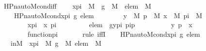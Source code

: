 \begin{isabellebody}
\isamarkupfalse%
\ HPn{\isacharunderscore}{\kern0pt}auto{\isacharunderscore}{\kern0pt}M{\isacharunderscore}{\kern0pt}cond{\isacharunderscore}{\kern0pt}iff\ {\isacharcolon}{\kern0pt}\ \isanewline
\ \ {\isachardoublequoteopen}x{\isacharunderscore}{\kern0pt}pi\ {\isasymin}\ M\ {\isasymLongrightarrow}\ g\ {\isasymin}\ M\ {\isasymLongrightarrow}\ elem\ {\isasymin}\ M\ {\isasymLongrightarrow}\ \isanewline
\ \ \ \ HPn{\isacharunderscore}{\kern0pt}auto{\isacharunderscore}{\kern0pt}M{\isacharunderscore}{\kern0pt}cond{\isacharparenleft}{\kern0pt}x{\isacharunderscore}{\kern0pt}pi{\isacharcomma}{\kern0pt}\ g{\isacharcomma}{\kern0pt}\ elem{\isacharparenright}{\kern0pt}\ {\isasymlongleftrightarrow}\ \isanewline
\ \ \ \ \ \ {\isacharparenleft}{\kern0pt}{\isasymexists}y\ {\isasymin}\ M{\isachardot}{\kern0pt}\ {\isasymexists}p\ {\isasymin}\ M{\isachardot}{\kern0pt}\ {\isasymexists}x\ {\isasymin}\ M{\isachardot}{\kern0pt}\ {\isasymexists}pi\ {\isasymin}\ M{\isachardot}{\kern0pt}\ \isanewline
\ \ \ \ \ \ \ \ x{\isacharunderscore}{\kern0pt}pi\ {\isacharequal}{\kern0pt}\ {\isacharless}{\kern0pt}x{\isacharcomma}{\kern0pt}\ pi{\isachargreater}{\kern0pt}\ {\isasymand}\isanewline
\ \ \ \ \ \ \ \ elem\ {\isacharequal}{\kern0pt}\ {\isacharless}{\kern0pt}g{\isacharbackquote}{\kern0pt}{\isacharless}{\kern0pt}y{\isacharcomma}{\kern0pt}pi{\isachargreater}{\kern0pt}{\isacharcomma}{\kern0pt}\ pi{\isacharbackquote}{\kern0pt}p{\isachargreater}{\kern0pt}\ {\isasymand}\ \isanewline
\ \ \ \ \ \ \ \ {\isacharless}{\kern0pt}y{\isacharcomma}{\kern0pt}\ p{\isachargreater}{\kern0pt}\ {\isasymin}\ x\ {\isasymand}\ \isanewline
\ \ \ \ \ \ \ \ function{\isacharparenleft}{\kern0pt}pi{\isacharparenright}{\kern0pt}\isanewline
\ \ \ \ \ {\isacharparenright}{\kern0pt}{\isachardoublequoteclose}\isanewline
%
\isadelimproof
%
\endisadelimproof
%
\isatagproof
{}\isamarkupfalse%
\ {\isacharparenleft}{\kern0pt}rule\ iffI{\isacharparenright}{\kern0pt}\isanewline
\ \ \isamarkupfalse%
\ {\isachardoublequoteopen}HPn{\isacharunderscore}{\kern0pt}auto{\isacharunderscore}{\kern0pt}M{\isacharunderscore}{\kern0pt}cond{\isacharparenleft}{\kern0pt}x{\isacharunderscore}{\kern0pt}pi{\isacharcomma}{\kern0pt}\ g{\isacharcomma}{\kern0pt}\ elem{\isacharparenright}{\kern0pt}{\isachardoublequoteclose}\isanewline
\ \ \ inM\ {\isacharcolon}{\kern0pt}\ {\isachardoublequoteopen}x{\isacharunderscore}{\kern0pt}pi\ {\isasymin}\ M{\isachardoublequoteclose}\ {\isachardoublequoteopen}g\ {\isasymin}\ M{\isachardoublequoteclose}\ {\isachardoublequoteopen}elem\ {\isasymin}\ M{\isachardoublequoteclose}\isanewline

\end{isabellebody}
